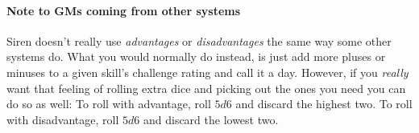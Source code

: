 \paragraph{Note to GMs coming from other systems} Siren doesn't really use \textit{advantages} or \textit{disadvantages} the same way some other systems do. What you would normally do instead, is just add more pluses or minuses to a given skill's challenge rating and call it a day.
However, if you \textit{really} want that feeling of rolling extra dice and picking out the ones you need you can do so as well: To roll with advantage, roll $5d6$ and discard the highest two. To roll with disadvantage, roll $5d6$ and discard the lowest two.

\newpage

